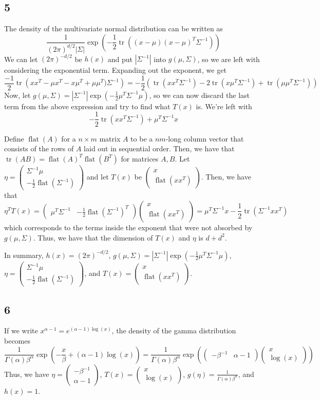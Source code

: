 \documentclass{article}
\newcommand{\openm}{\begin{pmatrix}}
\newcommand{\closem}{\end{pmatrix}}
\DeclareMathOperator{\tr}{tr}
\DeclareMathOperator{\flatv}{flat}
\begin{document}
\subsection*{5}
The density of the multivariate normal distribution can be written as 
\[\frac{1}{(2\pi)^{d/2}|\Sigma|}\exp\left(-\frac{1}{2}\tr\left((x-\mu)(x-\mu)^T\Sigma^{-1}\right)\right)\]
We can let $(2\pi)^{-d/2}$ be $h(x)$ and put $|\Sigma^{-1}|$ into $g(\mu, \Sigma)$, so we are left with considering the exponential term. Expanding out the exponent, we get
\[\frac{-1}{2}\tr\left(xx^T-\mu x^T-x\mu^T+\mu\mu^T)\Sigma^{-1}\right)=-\frac{1}{2}\left(\tr(xx^T\Sigma^{-1})-2\tr(x\mu^T\Sigma^{-1})+\tr(\mu\mu^T\Sigma^{-1})\right)\]
Now, let $g(\mu,\Sigma)=|\Sigma^{-1}|\exp\left(-\frac{1}{2}\mu^T\Sigma^{-1}\mu\right)$, so we can now discard the last term from the above expression and try to find what $T(x)$ is. We're left with
\[-\frac{1}{2}\tr(xx^T\Sigma^{-1})+\mu^T\Sigma^{-1}x\]

Define $\flatv(A)$ for a $n\times m$ matrix $A$ to be a $nm$-long column vector that consists of the rows of $A$ laid out in sequential order. Then, we have that $\tr(AB)=\flatv(A)^T\flatv(B^T)$ for matrices $A,B$. Let $\eta=\openm\Sigma^{-1}\mu\\-\frac{1}{2}\flatv(\Sigma^{-1})\closem$ and let $T(x)$ be $\openm x\\\flatv(xx^T)\closem$. Then, we have that
\[\eta^TT(x)=\openm\mu^T\Sigma^{-1}&-\frac{1}{2}\flatv(\Sigma^{-1})^T\closem\openm x\\\flatv(xx^T)\closem=\mu^T\Sigma^{-1}x-\frac{1}{2}\tr(\Sigma^{-1}xx^T)\]
which corresponds to the terms inside the exponent that were not absorbed by $g(\mu,\Sigma)$. Thus, we have that the dimension of $T(x)$ and $\eta$ is $d+d^2$.

In summary, $h(x)=(2\pi)^{-d/2}$, $g(\mu,\Sigma)=|\Sigma^{-1}|\exp\left(-\frac{1}{2}\mu^T\Sigma^{-1}\mu\right)$, $\eta=\openm\Sigma^{-1}\mu\\-\frac{1}{2}\flatv(\Sigma^{-1})\closem$, and $T(x)=\openm x\\\flatv(xx^T)\closem$.
\subsection*{6}
If we write $x^{\alpha-1}=e^{(\alpha-1)\log(x)}$, the density of the gamma distribution becomes
\[\frac{1}{\Gamma(\alpha)\beta^\alpha}\exp\left(-\frac{x}{\beta}+(\alpha-1)\log(x)\right)=\frac{1}{\Gamma(\alpha)\beta^\alpha}\exp\left(\openm-\beta^{-1}&\alpha-1\closem\openm x\\\log(x)\closem\right)\]
Thus, we have $\eta=\openm-\beta^{-1}\\\alpha-1\closem$, $T(x)=\openm x\\\log(x)\closem$, $g(\eta)=\frac{1}{\Gamma(\alpha)\beta^\alpha}$, and $h(x)=1$.
\end{document}
